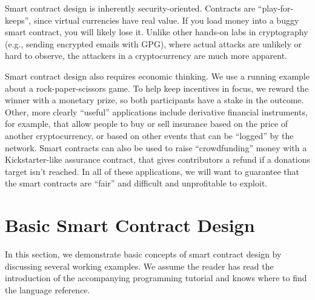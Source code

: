 \documentclass[12pt]{article}
\begin{document}
Smart contract design is inherently security-oriented. Contracts are ``play-for-keeps”, since virtual currencies have real value. If you load money into a buggy smart contract, you will likely lose it. Unlike other hands-on labs in cryptography (e.g., sending encrypted emails with GPG), where actual attacks are unlikely or hard to observe, the attackers in a cryptocurrency are much more apparent.%

Smart contract design also requires economic thinking. We use a running example about a rock-paper-scissors game. To help keep incentives in focus, we reward the winner with a monetary prize, so both participants have a stake in the outcome.  Other, more clearly “useful” applications include derivative financial instruments, for example, that allow people to buy or sell insurance based on the price of another cryptocurrency, or based on other events that can be “logged” by the network. Smart contracts can also be used to raise “crowdfunding” money with a Kickstarter-like assurance contract, that gives contributors a refund if a donations target isn’t reached. In all of these applications, we will want to guarantee that the smart contracts are ``fair'' and difficult and unprofitable to exploit.




\section{Basic Smart Contract Design}

In this section, we demonstrate basic concepts of smart contract design by discussing several working examples. We assume the reader has read the introduction of the accompanying programming tutorial and knows where to find the language reference.
\end{document}
